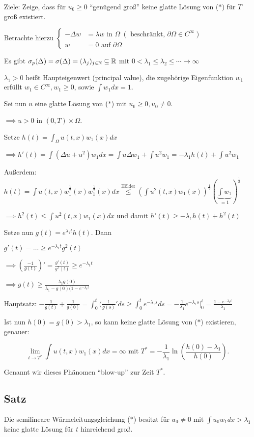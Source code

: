 Ziele: Zeige, dass für $u_0 \geq 0$ ``genügend groß'' keine glatte Lösung von ($\ast$) für $T$ groß existiert.

Betrachte hierzu $\begin{cases} -\Delta w &= \lambda w \text{ in } \Omega \;(\text{ beschränkt, } \partial\Omega \in C^\infty) \\ w &= 0 \text{ auf } \partial \Omega \end{cases}$

Es gibt $\sigma_p(\Delta) = \sigma(\Delta) = (\lambda_j)_{j \in \mathbb{N}} \subseteq \mathbb{R}$ mit $0 < \lambda_1 \leq \lambda_2 \leq \cdots \to \infty$

$\lambda_1 > 0$ heißt Haupteigenwert (principal value), die zugehörige Eigenfunktion $w_1$ erfüllt $w_1 \in C^\infty, w_1 \geq 0$, sowie $\int w_1 dx = 1$.

Sei nun $u$ eine glatte Lösung von ($\ast$) mit $u_0 \geq 0, u_0 \neq 0$.

$\implies u > 0$ in $(0, T) \times \Omega$.

Setze $h(t) = \int_\Omega u(t,x) w_1(x) dx$

$\implies h'(t) = \int(\Delta u + u^2)w_1 dx = \int u\Delta w_1 + \int u^2 w_1 = - \lambda_1 h(t) + \int u^2 w_1$

Außerdem: $h(t) = \int u(t,x) w_1^{\frac{1}{2}}(x) w_1^{\frac{1}{2}}(x) dx \overset{\text{Hölder}}{\leq} (\int u^2(t,x) w_1(x))^{\frac{1}{2}} (\underbrace{\int w_1}_{=1})^{\frac{1}{2}}$

$\implies h^2(t) \leq \int u^2(t,x) w_1(x) dx$ und damit $h'(t) \geq -\lambda_1 h(t) + h^2(t)$

Setze nun $g(t) = e^{\lambda_1 t} h(t)$. Dann

$g'(t) = \dots \geq e^{-\lambda_1 t} g^2(t)$

$\implies (\frac{-1}{g(t)})' = \frac{g'(t)}{g^2(t)} \geq e^{-\lambda_1 t}$

$\implies g(t) \geq \frac{\lambda_1 g(0)}{\lambda_1 - g(0)(1 - e^{-\lambda_1 t}}$

{\tiny{Hauptsatz: $-\frac{1}{g(t)} + \frac{1}{g(0)} = \int_0^t (\frac{1}{g(s)}' ds \geq \int_0^t e^{-\lambda_1 s} ds = - \frac{1}{\lambda_1} e^{-\lambda_1 s}|_0^t = \frac{1 - e^{-\lambda_1 t}}{\lambda_1} $ }}

Ist nun $h(0) = g(0) > \lambda_1$, so kann keine glatte Lösung von ($\ast$) existieren, genauer:

$$
\lim_{t \to T^*} \int u(t,x) w_1(x) dx = \infty \text{ mit } T^* = -\frac{1}{\lambda_1} \ln (\frac{h(0) - \lambda_1}{h(0)}).
$$

Genannt wir dieses Phänomen ``blow-up'' zur Zeit $T^*$.

\subsection{Satz}

Die semilineare Wärmeleitungsgleichung ($\ast$) besitzt für $u_0 \neq 0$ mit $\int u_0 w_1 dx > \lambda_1$ keine glatte Lösung für $t$ hinreichend groß.

